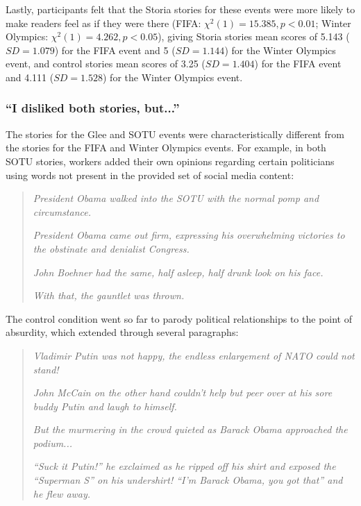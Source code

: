 Lastly, participants felt that the Storia stories for these events were more likely to make readers feel as if they were there (FIFA: $\chi^2(1)=15.385, p<0.01$; Winter Olympics: $\chi^2(1)=4.262, p<0.05$), giving Storia stories mean scores of 5.143 ($SD=1.079$) for the FIFA event and 5 ($SD=1.144$) for the Winter Olympics event, and control stories mean scores of 3.25 ($SD=1.404$) for the FIFA event and 4.111 ($SD=1.528$) for the Winter Olympics event.



\subsubsection{``I disliked both stories, but...''}
The stories for the Glee and SOTU events were characteristically different from the stories for the FIFA and Winter Olympics events. For example, in both SOTU stories, workers added their own opinions regarding certain politicians using words not present in the provided set of social media content:

\begin{quote}
\emph{President Obama walked into the SOTU with the normal pomp and circumstance.}

\emph{President Obama came out firm, expressing his overwhelming victories to the obstinate and denialist Congress.}

\emph{John Boehner had the same, half asleep, half drunk look on his face.}

\emph{With that, the gauntlet was thrown.}

\end{quote}

The control condition went so far to parody political relationships to the point of absurdity, which extended through several paragraphs:

\begin{quote}
\emph{Vladimir Putin was not happy, the endless enlargement of NATO could not stand!}

\emph{John McCain on the other hand couldn't help but peer over at his sore buddy Putin and laugh to himself.}

\emph{But the murmering in the crowd quieted as Barack Obama approached the podium...}

\emph{``Suck it Putin!'' he exclaimed as he ripped off his shirt and exposed the ``Superman S'' on his undershirt! ``I'm Barack Obama, you got that'' and he flew away.}

\end{quote}

